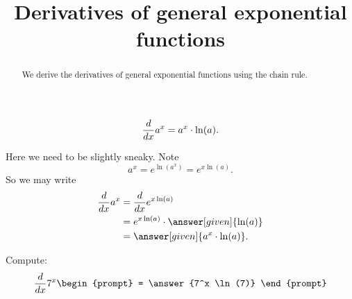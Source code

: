 \documentclass{ximera}
\title[Dig-In:]{Derivatives of general exponential functions}
\begin{document}
\begin{abstract}
  We derive the derivatives of  general exponential functions using the chain rule.
\end{abstract}
\maketitle


\begin{theorem}
  \[
  \frac{d}{\mathop{}\!d x} a^x = a^x\cdot \ln(a).
  \]
  \begin{explanation}
    Here we need to be slightly sneaky. Note
    \[
    a^x = e^{\ln(a^x)} = e^{x\ln(a)}.
    \]
    So we may write
    \begin{align*}
      \ddx a^x &= \ddx e^{x\ln(a)}\\
      &= e^{x\ln(a)} \cdot \answer[given]{\ln(a)}\\
      &= \answer[given]{a^x\cdot \ln(a)}.
    \end{align*}
  \end{explanation}
\end{theorem}

\begin{question}
  Compute:
  \[
  \ddx 7^x
  \begin{prompt}
    = \answer{7^x \ln(7)}
  \end{prompt}
  \]
\end{question}
\end{document}
